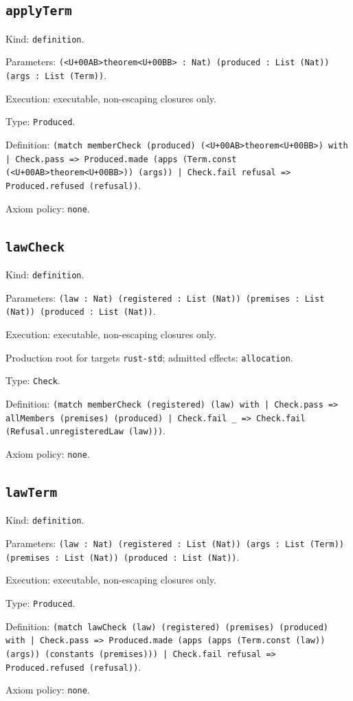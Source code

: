 \documentclass[11pt]{article}
\begin{document}
\subsection*{\texttt{applyTerm}}
\noindent Kind: \texttt{definition}.\par
\noindent Parameters: \texttt{(<U+00AB>theorem<U+00BB> : Nat) (produced : List (Nat)) (args : List (Term))}.\par
\noindent Execution: executable, non-escaping closures only.\par
\noindent Type: \texttt{Produced}.\par
\noindent Definition: \texttt{(match memberCheck (produced) (<U+00AB>theorem<U+00BB>) with | Check.pass => Produced.made (apps (Term.const (<U+00AB>theorem<U+00BB>)) (args)) | Check.fail refusal => Produced.refused (refusal))}.\par
\noindent Axiom policy: \texttt{none}.\par
\subsection*{\texttt{lawCheck}}
\noindent Kind: \texttt{definition}.\par
\noindent Parameters: \texttt{(law : Nat) (registered : List (Nat)) (premises : List (Nat)) (produced : List (Nat))}.\par
\noindent Execution: executable, non-escaping closures only.\par
\noindent Production root for targets \texttt{rust-std}; admitted effects: \texttt{allocation}.\par
\noindent Type: \texttt{Check}.\par
\noindent Definition: \texttt{(match memberCheck (registered) (law) with | Check.pass => allMembers (premises) (produced) | Check.fail \_ => Check.fail (Refusal.unregisteredLaw (law)))}.\par
\noindent Axiom policy: \texttt{none}.\par
\subsection*{\texttt{lawTerm}}
\noindent Kind: \texttt{definition}.\par
\noindent Parameters: \texttt{(law : Nat) (registered : List (Nat)) (args : List (Term)) (premises : List (Nat)) (produced : List (Nat))}.\par
\noindent Execution: executable, non-escaping closures only.\par
\noindent Type: \texttt{Produced}.\par
\noindent Definition: \texttt{(match lawCheck (law) (registered) (premises) (produced) with | Check.pass => Produced.made (apps (apps (Term.const (law)) (args)) (constants (premises))) | Check.fail refusal => Produced.refused (refusal))}.\par
\noindent Axiom policy: \texttt{none}.\par
\end{document}
